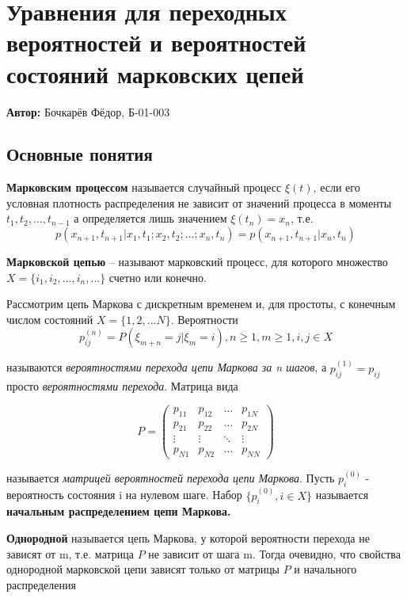 \section{Уравнения для переходных вероятностей и вероятностей состояний марковских цепей}

 \textbf{Автор:} Бочкарёв Фёдор, Б-01-003

\subsection{Основные понятия} 

\textbf{Марковским процессом} называется случайный процесс $\xi (t)$, если его условная плотность распределения не зависит от значений процесса в моменты $t_1, t_2, ..., t_{n-1}$ а определяется лишь значением $\xi(t_n) = x_n$, т.е.
$$p(x_{n + 1}, t_{n + 1} | x_1, t_1; x_2, t_2;...;x_n, t_n) = p(x_{n + 1}, t_{n + 1} | x_n, t_n)$$

\textbf{Марковской цепью} -- называют марковский процесс, для которого множество $X = \{i_1, i_2, ..., i_n, ...\}$ счетно или конечно. 
\par\medskip

Рассмотрим цепь Маркова с дискретным временем и, для простоты, с конечным числом состояний $X = \{1, 2, ... N\}$. Вероятности
$$p_{ij}^{(n)} = P(\xi_{m+n} = j | \xi_m = i), n \geq 1, m \geq 1, i,j \in X $$

называются \textit{вероятностями перехода цепи Маркова за n шагов}, а $p_{ij}^{(1)} = p_{ij}$ просто \textit{вероятностями перехода}. Матрица вида

\begin{equation*}
	P = \left(
	\begin{array}{cccc}
	p_{11} & p_{12} & \ldots & p_{1N}\\
	p_{21} & p_{22} & \ldots & p_{2N}\\
	\vdots & \vdots & \ddots & \vdots\\
	p_{N1} & p_{N2} & \ldots & p_{NN}
	\end{array}
	\right)
\end{equation*}

называется \textit{матрицей вероятностей перехода цепи Маркова}.
Пусть $p_i^{(0)}$ - вероятность состояния i на нулевом шаге. Набор $\{p_i^{(0)}, i \in X\}$ называется \textbf{начальным распределением цепи Маркова.}
\par\medskip

\textbf{Однородной} называется цепь Маркова, у которой вероятности перехода не зависят от m, т.е. матрица $P$ не зависит от шага m. Тогда очевидно, что свойства однородной марковской цепи зависят только от матрицы $P$ и начального распределения


